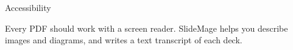 
\begin{sectionframe}{Accessibility}
	\begin{minipage}[t]{0.9\linewidth}\small
		Every PDF should work with a screen reader. SlideMage helps you describe images and diagrams, and writes a text transcript of each deck.
	\end{minipage}\par\medskip
	\SMChapterAgenda
\end{sectionframe}
